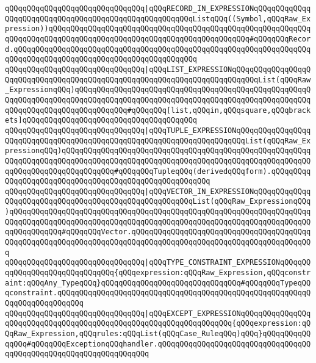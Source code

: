 \verb|qQQqqQQqqQQqqQQqqQQqqQQqqQQqqQQq|\verb#|qQQqRECORD_IN_EXPRESSIONqQQqqQQqqQQqqQQqqQQqqQQqqQQqqQQqqQQqqQQqqQQqqQQqqQQqqQQqListqQQq((Symbol,qQQqRaw_Expression))qQQqqQQqqQQqqQQqqQQqqQQqqQQqqQQqqQQqqQQqqQQqqQQqqQQqqQQqqQQqqQQqqQQqqQQqqQQqqQQqqQQqqQQqqQQqqQQqqQQqqQQqqQQqqQQqqQQq#\verb|#qQQqqQQqRecord.qQQqqQQqqQQqqQQqqQQqqQQqqQQqqQQqqQQqqQQqqQQqqQQqqQQqqQQqqQQqqQQqqQQqqQQqqQQqqQQqqQQqqQQqqQQqqQQqqQQqqQQqqQQqqQQq|\newline
\verb|qQQqqQQqqQQqqQQqqQQqqQQqqQQqqQQq|\verb#|qQQqLIST_EXPRESSIONqQQqqQQqqQQqqQQqqQQqqQQqqQQqqQQqqQQqqQQqqQQqqQQqqQQqqQQqqQQqqQQqqQQqqQQqqQQqList(qQQqRaw_ExpressionqQQq)qQQqqQQqqQQqqQQqqQQqqQQqqQQqqQQqqQQqqQQqqQQqqQQqqQQqqQQqqQQqqQQqqQQqqQQqqQQqqQQqqQQqqQQqqQQqqQQqqQQqqQQqqQQqqQQqqQQqqQQqqQQqqQQqqQQqqQQqqQQqqQQqqQQqqQQq#\verb|#qQQqqQQq[list,qQQqin,qQQqsquare,qQQqbrackets]qQQqqQQqqQQqqQQqqQQqqQQqqQQqqQQqqQQqqQQq|\newline
\verb|qQQqqQQqqQQqqQQqqQQqqQQqqQQqqQQq|\verb#|qQQqTUPLE_EXPRESSIONqQQqqQQqqQQqqQQqqQQqqQQqqQQqqQQqqQQqqQQqqQQqqQQqqQQqqQQqqQQqqQQqqQQqqQQqList(qQQqRaw_ExpressionqQQq)qQQqqQQqqQQqqQQqqQQqqQQqqQQqqQQqqQQqqQQqqQQqqQQqqQQqqQQqqQQqqQQqqQQqqQQqqQQqqQQqqQQqqQQqqQQqqQQqqQQqqQQqqQQqqQQqqQQqqQQqqQQqqQQqqQQqqQQqqQQqqQQqqQQqqQQq#\verb|#qQQqqQQqTupleqQQq(derivedqQQqform).qQQqqQQqqQQqqQQqqQQqqQQqqQQqqQQqqQQqqQQqqQQqqQQqqQQqqQQq|\newline
\verb|qQQqqQQqqQQqqQQqqQQqqQQqqQQqqQQq|\verb#|qQQqVECTOR_IN_EXPRESSIONqQQqqQQqqQQqqQQqqQQqqQQqqQQqqQQqqQQqqQQqqQQqqQQqqQQqqQQqList(qQQqRaw_ExpressionqQQq)qQQqqQQqqQQqqQQqqQQqqQQqqQQqqQQqqQQqqQQqqQQqqQQqqQQqqQQqqQQqqQQqqQQqqQQqqQQqqQQqqQQqqQQqqQQqqQQqqQQqqQQqqQQqqQQqqQQqqQQqqQQqqQQqqQQqqQQqqQQqqQQqqQQqqQQq#\verb|#qQQqqQQqVector.qQQqqQQqqQQqqQQqqQQqqQQqqQQqqQQqqQQqqQQqqQQqqQQqqQQqqQQqqQQqqQQqqQQqqQQqqQQqqQQqqQQqqQQqqQQqqQQqqQQqqQQqqQQqqQQq|\newline
\verb|qQQqqQQqqQQqqQQqqQQqqQQqqQQqqQQq|\verb#|qQQqTYPE_CONSTRAINT_EXPRESSIONqQQqqQQqqQQqqQQqqQQqqQQqqQQqqQQq{qQQqexpression:qQQqRaw_Expression,qQQqconstraint:qQQqAny_TypeqQQq}qQQqqQQqqQQqqQQqqQQqqQQqqQQqqQQq#\verb|#qQQqqQQqTypeqQQqconstraint.qQQqqQQqqQQqqQQqqQQqqQQqqQQqqQQqqQQqqQQqqQQqqQQqqQQqqQQqqQQqqQQqqQQqqQQqqQQq|\newline
\verb|qQQqqQQqqQQqqQQqqQQqqQQqqQQqqQQq|\verb#|qQQqEXCEPT_EXPRESSIONqQQqqQQqqQQqqQQqqQQqqQQqqQQqqQQqqQQqqQQqqQQqqQQqqQQqqQQqqQQqqQQqqQQq{qQQqexpression:qQQqRaw_Expression,qQQqrules:qQQqList(qQQqCase_RuleqQQq)qQQq}qQQqqQQqqQQqqQQq#\verb|#qQQqqQQqExceptionqQQqhandler.qQQqqQQqqQQqqQQqqQQqqQQqqQQqqQQqqQQqqQQqqQQqqQQqqQQqqQQqqQQqqQQqqQQq|\newline
